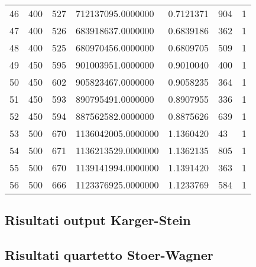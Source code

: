 \begin{longtable}[c]{lllllll}
  46 & 400 & 527 & 712137095.0000000 & 0.7121371 & 904 & 1 \\
  47 & 400 & 526 & 683918637.0000000 & 0.6839186 & 362 & 1 \\
  48 & 400 & 525 & 680970456.0000000 & 0.6809705 & 509 & 1 \\
  49 & 450 & 595 & 901003951.0000000 & 0.9010040 & 400 & 1 \\
  50 & 450 & 602 & 905823467.0000000 & 0.9058235 & 364 & 1 \\
  51 & 450 & 593 & 890795491.0000000 & 0.8907955 & 336 & 1 \\
  52 & 450 & 594 & 887562582.0000000 & 0.8875626 & 639 & 1 \\
  53 & 500 & 670 & 1136042005.0000000 & 1.1360420 & 43 & 1 \\
  54 & 500 & 671 & 1136213529.0000000 & 1.1362135 & 805 & 1 \\
  55 & 500 & 670 & 1139141994.0000000 & 1.1391420 & 363 & 1 \\
  56 & 500 & 666 & 1123376925.0000000 & 1.1233769 & 584 & 1
  \label{tab:my-table}\\
  \end{longtable}

\subsection{Risultati output Karger-Stein}


\subsection{Risultati quartetto Stoer-Wagner}

